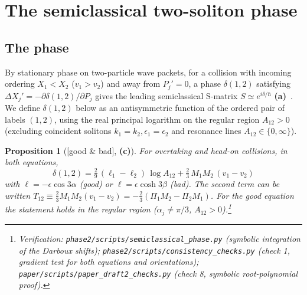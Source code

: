\documentclass[11pt,a4paper]{article}
\newcommand{\lab}[1]{{\normalfont\sffamily\footnotesize\bfseries(#1)}}
\newcommand{\La}{\lab{a}}
\newcommand{\Lc}{\lab{c}}
\newcommand{\eqtag}[2]{{\normalfont\sffamily\footnotesize\textcolor{#1}{[#2]}}}
\newcommand{\Both}{\eqtag{violet!70!black}{good \& bad}}
\newcommand{\scr}[1]{\nolinkurl{#1}}
\newcommand{\chk}[1]{\footnote{\raggedright Verification: #1.}}
\newcommand{\hb}{\hbar}
\newtheorem{proposition}{Proposition}[section]
\theoremstyle{remark}
\begin{document}
\section{The semiclassical two-soliton phase}\label{sec:phase}

\subsection{The phase}

By stationary phase on two-particle wave packets, for a collision with incoming ordering $X_1<X_2$ ($v_1>v_2$) and away from $P_j'=0$, a phase $\delta(1,2)$ satisfying $\Delta X_j'=-\partial\delta(1,2)/\partial P_j$ gives the leading semiclassical S-matrix $S\simeq e^{i\delta/\hb}$ \La~\cite{FK}. We define $\delta(1,2)$ below as an antisymmetric function of the ordered pair of labels $(1,2)$, using the real principal logarithm on the regular region $A_{12}>0$ (excluding coincident solitons $k_1=k_2,\epsilon_1=\epsilon_2$ and resonance lines $A_{12}\in\{0,\infty\}$).

\begin{proposition}[\Both, \Lc]\label{prop:delta}
For overtaking and head-on collisions, in both equations,
\begin{equation}\label{eq:delta}
\boxed{\ \delta(1,2)=\tfrac29\,(\ell_1-\ell_2)\,\log A_{12}+\tfrac23\,M_1M_2\,(v_1-v_2)\ }
\end{equation}
with $\ell=-\epsilon\cos3\alpha$ (good) or $\ell=\epsilon\cosh3\beta$ (bad). The second term can be written $T_{12}\equiv\tfrac23M_1M_2(v_1-v_2)=-\tfrac23(\Pi_1M_2-\Pi_2M_1)$. For the good equation the statement holds in the regular region ($\alpha_j\neq\pi/3$, $A_{12}>0$).\chk{\scr{phase2/scripts/semiclassical_phase.py} (symbolic integration of the Darboux shifts); \scr{phase2/scripts/consistency_checks.py} (check 1, gradient test for both equations and orientations); \scr{paper/scripts/paper_draft2_checks.py} (check 8, symbolic root-polynomial proof)}
\end{proposition}
\end{document}
